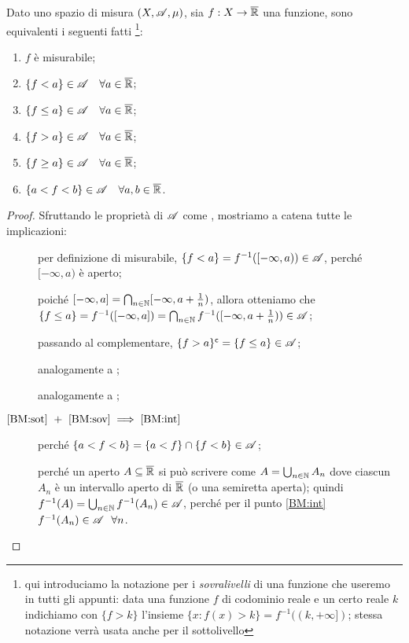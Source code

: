 \begin{proposition}\label{prop:BasicMis}
	Dato uno spazio di misura $(X,\mathscr A,\mu)$, sia $f:X\rightarrow \overline{\mathbb R}$ una funzione, sono equivalenti i seguenti fatti
	\footnote{qui introduciamo la notazione per i \textit{sovralivelli} di una funzione che useremo in tutti gli appunti:
		data una funzione $f$ di codominio reale e un certo reale $k$ indichiamo con $\{f>k\}$ l'insieme
		$\{x:f(x)>k\}=f^{-1}((k,+\infty])$; stessa notazione verrà usata anche per il sottolivello}:
	\begin{enumerate}[label=(\arabic*),ref=(\arabic*)]
		\item $f$ è misurabile; \label{BM:mis}
		\item $\{f<a\}\in \mathscr A \quad \forall a\in \overline{\mathbb R}$; \label{BM:sot}
		\item $\{f\leq a\}\in \mathscr A \quad \forall a\in \overline{\mathbb R}$; \label{BM:soteq}
		\item $\{f>a\}\in \mathscr A \quad \forall a\in \overline{\mathbb R}$; \label{BM:sov}
		\item $\{f\geq a\}\in \mathscr A \quad \forall a\in \overline{\mathbb R}$;  \label{BM:soveq}
		\item $\{a<f<b\}\in \mathscr A \quad \forall a,b\in \overline{\mathbb R}$. \label{BM:int}
	\end{enumerate}
\end{proposition}
\begin{proof}
	Sfruttando le proprietà di $\mathscr A$ come \sigalg, mostriamo a catena tutte le implicazioni:
	\begin{description}
	\item[] per definizione di misurabile, $\{f<a\}=f^{-1}([-\infty,a))\in \mathscr A$,
		perché $[-\infty,a)$ è aperto;
	\item[] poiché $[-\infty,a]=\bigcap_{n\in \mathbb N}[-\infty,a+\frac{1}{n})$, allora otteniamo che
		$\{f\leq a\}=f^{-1}([-\infty,a])=\bigcap_{n\in \mathbb N}f^{-1}([-\infty,a+\frac{1}{n}))\in \mathscr A$;
	\item[] passando al complementare, $\{f>a\}^\mathsf{c}=\{f\leq a\}\in \mathscr A$;
	\item[] analogamente a ; 
	\item[] analogamente a ;
	\item[$\text{\ref{BM:sot}}\ +\ \text{\ref{BM:sov}}\implies\text{\ref{BM:int}}$] perché
		$\{a<f<b\}=\{a<f\}\cap\{f<b\}\in \mathscr A$;
	\item[] perché un aperto $A\subseteq\overline{\mathbb R}$ si può scrivere come
		$A=\bigcup_{n\in \mathbb N}A_n$ dove ciascun $A_n$ è un intervallo aperto di $\overline{\mathbb R}$ (o una semiretta aperta);
		quindi $f^{-1}(A)=\bigcup_{n\in \mathbb N}f^{-1}(A_n)\in \mathscr A$, perché per il punto \ref{BM:int} $f^{-1}(A_n)\in \mathscr A\ \ \forall n$.
	\end{description}
\end{proof}

